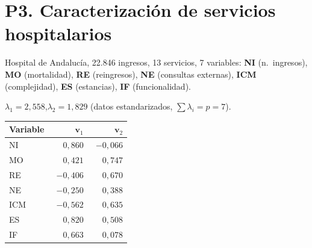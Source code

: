 \documentclass[11pt,a4paper]{article}
\begin{document}
\newpage
\section{P3. Caracterización de servicios hospitalarios}

\begin{enuncbox}
Hospital de Andalucía, 22.846 ingresos, 13 servicios, 7 variables: \textbf{NI} (n.\ ingresos), \textbf{MO} (mortalidad), \textbf{RE} (reingresos), \textbf{NE} (consultas externas), \textbf{ICM} (complejidad), \textbf{ES} (estancias), \textbf{IF} (funcionalidad).

\smallskip
$\lambda_1 = 2{,}558$,\quad $\lambda_2 = 1{,}829$ (datos estandarizados, $\sum\lambda_i=p=7$).

\begin{center}\small
\begin{tabular}{lrr}\toprule
Variable & $\bm v_1$ & $\bm v_2$\\\midrule
NI  & $\phantom{-}0{,}860$ & $-0{,}066$\\
MO  & $\phantom{-}0{,}421$ & $\phantom{-}0{,}747$\\
RE  & $-0{,}406$ & $\phantom{-}0{,}670$\\
NE  & $-0{,}250$ & $\phantom{-}0{,}388$\\
ICM & $-0{,}562$ & $\phantom{-}0{,}635$\\
ES  & $\phantom{-}0{,}820$ & $\phantom{-}0{,}508$\\
IF  & $\phantom{-}0{,}663$ & $\phantom{-}0{,}078$\\\bottomrule
\end{tabular}
\end{center}
\end{enuncbox}
\end{document}
